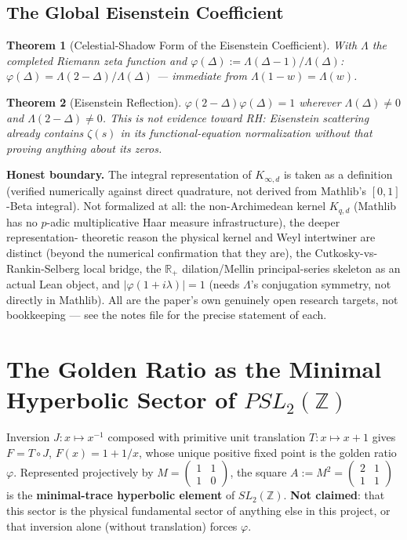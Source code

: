\documentclass{report}
\newtheorem{theorem}{Theorem}[chapter]
\theoremstyle{definition}
\begin{document}
\section{The Global Eisenstein Coefficient}

\begin{theorem}[Celestial-Shadow Form of the Eisenstein Coefficient]
  \label{thm:eisenstein-shadow-form}
  \leanok
  With $\Lambda$ the completed Riemann zeta function and $\varphi(\Delta):=\Lambda(\Delta-1)/\Lambda(\Delta)$:
  $\varphi(\Delta) = \Lambda(2-\Delta)/\Lambda(\Delta)$ --- immediate from $\Lambda(1-w)=\Lambda(w)$.
\end{theorem}

\begin{theorem}[Eisenstein Reflection]
  \label{thm:eisenstein-reflection}
  \leanok
  $\varphi(2-\Delta)\varphi(\Delta) = 1$ wherever $\Lambda(\Delta)\neq0$ and $\Lambda(2-\Delta)\neq0$.
  \emph{This is not evidence toward RH}: Eisenstein scattering already contains $\zeta(s)$ in
  its functional-equation normalization without that proving anything about its zeros.
\end{theorem}

\textbf{Honest boundary.} The integral representation of $K_{\infty,d}$ is taken as a
definition (verified numerically against direct quadrature, not derived from Mathlib's
$[0,1]$-Beta integral). Not formalized at all: the non-Archimedean kernel $K_{q,d}$ (Mathlib
has no $p$-adic multiplicative Haar measure infrastructure), the deeper representation-
theoretic reason the physical kernel and Weyl intertwiner are distinct (beyond the numerical
confirmation that they are), the Cutkosky-vs-Rankin-Selberg local bridge, the
$\mathbb{R}_+$ dilation/Mellin principal-series skeleton as an actual Lean object, and
$|\varphi(1+i\lambda)|=1$ (needs $\Lambda$'s conjugation symmetry, not directly in Mathlib).
All are the paper's own genuinely open research targets, not bookkeeping --- see the notes
file for the precise statement of each.

\chapter{The Golden Ratio as the Minimal Hyperbolic Sector of \texorpdfstring{$PSL_2(\mathbb{Z})$}{PSL2(Z)}}

Inversion $J:x\mapsto x^{-1}$ composed with primitive unit translation $T:x\mapsto x+1$ gives
$F=T\circ J$, $F(x)=1+1/x$, whose unique positive fixed point is the golden ratio $\varphi$.
Represented projectively by $M=\begin{pmatrix}1&1\\1&0\end{pmatrix}$, the square
$A:=M^2=\begin{pmatrix}2&1\\1&1\end{pmatrix}$ is the \textbf{minimal-trace hyperbolic element}
of $SL_2(\mathbb{Z})$. \textbf{Not claimed}: that this sector is the physical fundamental
sector of anything else in this project, or that inversion alone (without translation)
forces $\varphi$.
\end{document}
